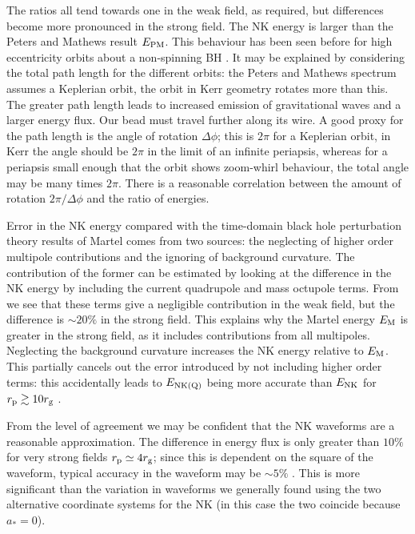 The ratios all tend towards one in the weak field, as required, but differences become more pronounced in the strong field. The NK energy is larger than the Peters and Mathews result $E_\mathrm{PM}$. This behaviour has been seen before for high eccentricity orbits about a non-spinning BH \citep{Gair2005}. It may be explained by considering the total path length for the different orbits: the Peters and Mathews spectrum assumes a Keplerian orbit, the orbit in Kerr geometry rotates more than this. The greater path length leads to increased emission of gravitational waves and a larger energy flux. Our bead must travel further along its wire. A good proxy for the path length is the angle of rotation $\Delta\phi$; this is $2\pi$ for a Keplerian orbit, in Kerr the angle should be $2\pi$ in the limit of an infinite periapsis, whereas for a periapsis small enough that the orbit shows zoom-whirl behaviour, the total angle may be many times $2\pi$. There is a reasonable correlation between the amount of rotation $2\pi/\Delta\phi$ and the ratio of energies.

Error in the NK energy compared with the time-domain black hole perturbation theory results of Martel comes from two sources: the neglecting of higher order multipole contributions and the ignoring of background curvature. The contribution of the former can be estimated by looking at the difference in the NK energy by including the current quadrupole and mass octupole terms. From  we see that these terms give a negligible contribution in the weak field, but the difference is $\sim20\%$ in the strong field. This explains why the Martel energy $E_\mathrm{M}$ is greater in the strong field, as it includes contributions from all multipoles. Neglecting the background curvature increases the NK energy relative to $E_\mathrm{M}$. This partially cancels out the error introduced by not including higher order terms: this accidentally leads to $E_\mathrm{NK(Q)}$ being more accurate than $E_\mathrm{NK}$ for $r_\mathrm{p} \gtrsim 10 r_\mathrm{g}$ \citep{Tanaka1993}.

From the level of agreement we may be confident that the NK waveforms are a reasonable approximation. The difference in energy flux is only greater than $10\%$ for very strong fields $r_\mathrm{p} \simeq 4 r_\mathrm{g}$; since this is dependent on the square of the waveform, typical accuracy in the waveform may be $\sim 5\%$ \citep{Gair2005,Tanaka1993}. This is more significant than the variation in waveforms we generally found using the two alternative coordinate systems for the NK (in this case the two coincide because $a_\ast = 0$).

